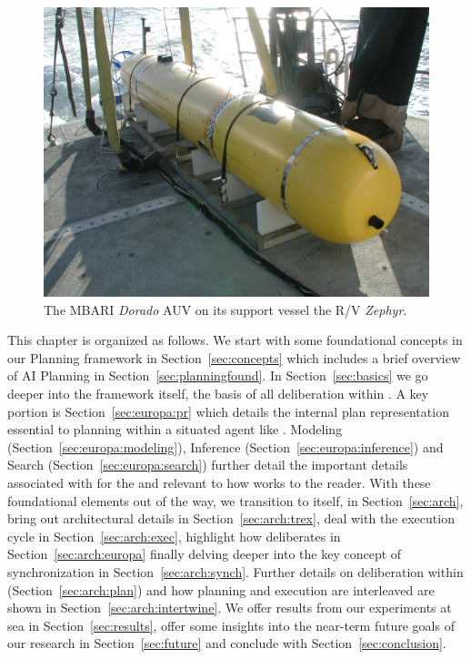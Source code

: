 \begin{figure}[t]
  \centering \vskip-5pt
  \includegraphics[scale=0.1]{figs/MBARI-AUV.jpg}
  \caption{\small The MBARI \emph{Dorado} AUV on its support vessel
    the R/V \emph{Zephyr}.}
  \label{fig:auv-fig}
  \vskip-0.3cm
\end{figure}

This chapter is organized as follows. We start with some foundational
concepts in our Planning framework in Section~\ref{sec:concepts} which
includes a brief overview of AI Planning in
Section~\ref{sec:planningfound}. In Section~\ref{sec:basics} we go
deeper into the \eu framework itself, the basis of all deliberation
within \rxe. A key portion is Section~\ref{sec:europa:pr} which
details the internal plan representation essential to planning within
a situated agent like \rxe. Modeling
(Section~\ref{sec:europa:modeling}), Inference
(Section~\ref{sec:europa:inference}) and Search
(Section~\ref{sec:europa:search}) further detail the important details
associated with \eu for the and relevant to how \rx works to the
reader. With these foundational elements out of the way, we transition
to \rx itself, in Section~\ref{sec:arch}, bring out architectural
details in Section~\ref{sec:arch:trex}, deal with the execution cycle
in Section~\ref{sec:arch:exec}, highlight how \rx deliberates in
Section~\ref{sec:arch:europa} finally delving deeper into the key
concept of synchronization in Section~\ref{sec:arch:synch}. Further
details on deliberation within \rx (Section~\ref{sec:arch:plan}) and
how planning and execution are interleaved are shown in
Section~\ref{sec:arch:intertwine}. We offer results from our
experiments at sea in Section~\ref{sec:results}, offer some insights
into the near-term future goals of our research in
Section~\ref{sec:future} and conclude with
Section~\ref{sec:conclusion}.

